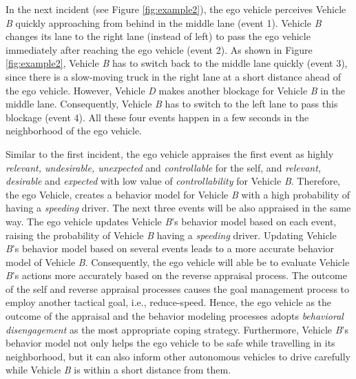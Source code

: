 \documentclass[journal, 11pt]{IEEEtran}
\begin{document}
In the next incident (see Figure \ref{fig:example2}), the ego vehicle perceives
Vehicle \textit{B} quickly approaching from behind in the middle lane (event 1).
Vehicle \textit{B} changes its lane to the right lane (instead of left) to pass
the ego vehicle immediately after reaching the ego vehicle (event 2). As
shown in Figure \ref{fig:example2}, Vehicle \textit{B} has to switch back to the
middle lane quickly (event 3), since there is a slow-moving truck in the right
lane at a short distance ahead of the ego vehicle. However, Vehicle \textit{D}
makes another blockage for Vehicle \textit{B} in the middle lane. Consequently,
Vehicle \textit{B} has to switch to the left lane to pass this blockage (event
4). All these four events happen in a few seconds in the neighborhood of the ego
vehicle.

Similar to the first incident, the ego vehicle appraises the first event as
highly \textit{relevant, undesirable, unexpected} and \textit{controllable} for
the self, and \textit{relevant, desirable} and \textit{expected} with low value
of \textit{controllability} for Vehicle \textit{B}. Therefore, the ego Vehicle,
creates a behavior model for Vehicle \textit{B} with a high probability of
having a \textit{speeding} driver. The next three events will be also appraised
in the same way. The ego vehicle updates Vehicle \textit{B}'s behavior model
based on each event, raising the probability of Vehicle \textit{B} having a
\textit{speeding} driver. Updating Vehicle \textit{B}'s behavior model based on
several events leads to a more accurate behavior model of Vehicle \textit{B}.
Consequently, the ego vehicle will able be to evaluate Vehicle \textit{B}'s
actions more accurately based on the reverse appraisal process. The outcome of
the self and reverse appraisal processes causes the goal management process to
employ another tactical goal, i.e., reduce-speed. Hence, the ego vehicle as the
outcome of the appraisal and the behavior modeling processes adopts
\textit{behavioral disengagement} as the most appropriate coping strategy.
Furthermore, Vehicle \textit{B}'s behavior model not only helps the ego vehicle
to be safe while travelling in its neighborhood, but it can also inform other
autonomous vehicles to drive carefully while Vehicle \textit{B} is within a
short distance from them.
\end{document}
